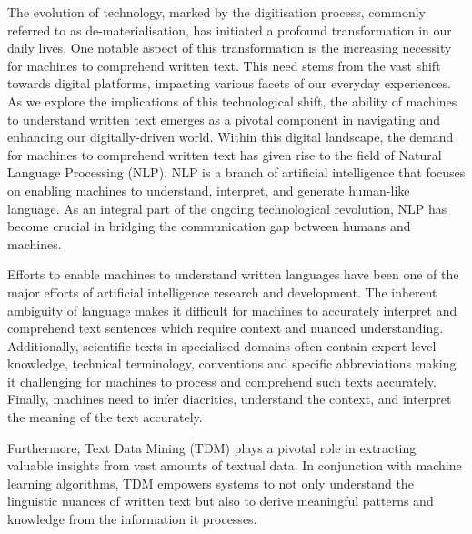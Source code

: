 

The evolution of technology, marked by the digitisation process, commonly referred to as de-materialisation, has initiated a profound transformation in our daily lives. One notable aspect of this transformation is the increasing necessity for machines to comprehend written text. This need stems from the vast shift towards digital platforms, impacting various facets of our everyday experiences. 
As we explore the implications of this technological shift, the ability of machines to understand written text emerges as a pivotal component in navigating and enhancing our digitally-driven world.
Within this digital landscape, the demand for machines to comprehend written text has given rise to the field of Natural Language Processing (NLP). NLP is a branch of artificial intelligence that focuses on enabling machines to understand, interpret, and generate human-like language. As an integral part of the ongoing technological revolution, NLP has become crucial in bridging the communication gap between humans and machines.

Efforts to enable machines to understand written languages have been one of the major efforts of artificial intelligence research and development. 
The inherent ambiguity of language makes it difficult for machines to accurately interpret and comprehend text sentences which require context and nuanced understanding. 
Additionally, scientific texts in specialised domains often contain expert-level knowledge, technical terminology, conventions and specific abbreviations making it challenging for machines to process and comprehend such texts accurately. 
Finally, machines need to infer diacritics, understand the context, and interpret the meaning of the text accurately. 


Furthermore, Text Data Mining (TDM) plays a pivotal role in extracting valuable insights from vast amounts of textual data. In conjunction with machine learning algorithms, TDM empowers systems to not only understand the linguistic nuances of written text but also to derive meaningful patterns and knowledge from the information it processes.

